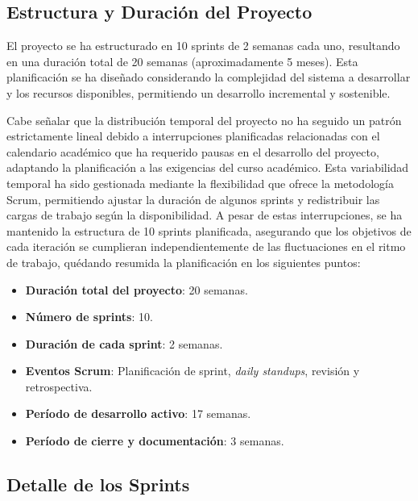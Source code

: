 
\subsection{Estructura y Duración del Proyecto}
El proyecto se ha estructurado en 10 sprints de 2 semanas cada uno, resultando en una duración total de 20 semanas (aproximadamente 5 meses). Esta planificación se ha diseñado considerando la complejidad del sistema a desarrollar y los recursos disponibles, permitiendo un desarrollo incremental y sostenible.

Cabe señalar que la distribución temporal del proyecto no ha seguido un patrón estrictamente lineal debido a interrupciones planificadas relacionadas con el calendario académico que ha requerido pausas en el desarrollo del proyecto, adaptando la planificación a las exigencias del curso académico. Esta variabilidad temporal ha sido gestionada mediante la flexibilidad que ofrece la metodología Scrum, permitiendo ajustar la duración de algunos sprints y redistribuir las cargas de trabajo según la disponibilidad. A pesar de estas interrupciones, se ha mantenido la estructura de 10 sprints planificada, asegurando que los objetivos de cada iteración se cumplieran independientemente de las fluctuaciones en el ritmo de trabajo, quédando resumida la planificación en los siguientes puntos:

\begin{itemize}
\tightlist
\item
\textbf{Duración total del proyecto}: 20 semanas.
\item
\textbf{Número de sprints}: 10.
\item
\textbf{Duración de cada sprint}: 2 semanas.
\item
\textbf{Eventos Scrum}: Planificación de sprint, \emph{daily standups}, revisión y retrospectiva.
\item
\textbf{Período de desarrollo activo}: 17 semanas.
\item
\textbf{Período de cierre y documentación}: 3 semanas.
\end{itemize}

\subsection{Detalle de los Sprints}

